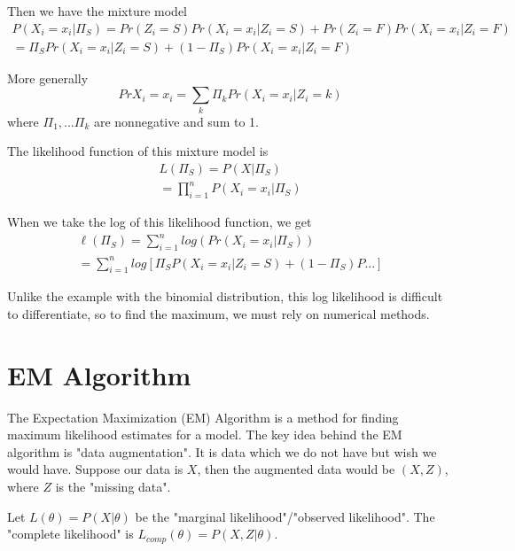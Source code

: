 \documentclass[10pt,a4paper]{article}
\begin{document}
Then we have the mixture model \begin{equation}
\begin{aligned}
P(X_i = x_i|\Pi_S) = Pr(Z_i=S)Pr(X_i = x_i|Z_i=S) + Pr(Z_i = F)Pr(X_i=x_i|Z_i = F) \\
 = \Pi_SPr(X_i = x_i|Z_i=S) + (1-\Pi_S)Pr(X_i=x_i|Z_i = F)
\end{aligned}
\end{equation}

More generally \begin{equation}
Pr{X_i = x_i} = \sum_{k}\Pi_kPr(X_i = x_i|Z_i = k)
\end{equation}
where $\Pi_1,...\Pi_k$ are nonnegative and sum to 1.

The likelihood function of this mixture model is
\begin{equation}
\begin{aligned}
L(\Pi_S) = P(X|\Pi_S)\\=\prod_{i=1}^{n}P(X_i=x_i|\Pi_S)
\end{aligned}
\end{equation}

When we take the log of this likelihood function, we get \begin{equation}
\begin{aligned}
\ell(\Pi_S) = \sum_{i=1}^{n}log(Pr(X_i=x_i|\Pi_S))\\
= \sum_{i=1}^{n}log[\Pi_SP(X_i=x_i|Z_i=S)+(1-\Pi_S)P...]
\end{aligned}
\end{equation}

Unlike the example with the binomial distribution, this log likelihood is difficult to differentiate, so to find the maximum, we must rely on numerical methods.

\section{EM Algorithm}
The Expectation Maximization (EM) Algorithm is a method for finding maximum likelihood estimates for a model. The key idea behind the EM algorithm is "data augmentation". It is data which we do not have but wish we would have. Suppose our data is $X$, then the augmented data would be $(X,Z)$, where $Z$ is the "missing data".

Let $L(\theta) = P(X|\theta)$ be the "marginal likelihood"/"observed likelihood". The "complete likelihood" is $L_{comp}(\theta) = P(X,Z|\theta)$. 
\end{document}
